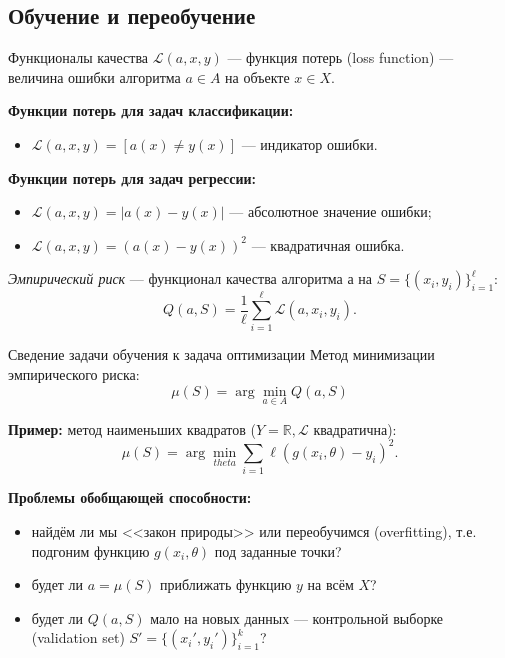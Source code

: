 \documentclass{beamer}
\begin{document}
\subsection{Обучение и переобучение}
\begin{frame}{Функционалы качества}
$\mathscr{L}(a, x, y)$ --- функция потерь (loss function) --- величина ошибки алгоритма $a \in A$ на объекте $x \in X$.

{\bf Функции потерь для задач классификации:}
\begin{itemize}
    \item $\mathscr{L}(a, x, y) = [a(x) \ne y(x)]$ --- индикатор ошибки.
\end{itemize}

{\bf Функции потерь для задач регрессии:}
\begin{itemize}
    \item $\mathscr{L}(a, x, y) = |a(x) - y(x)|$ --- абсолютное значение ошибки;
    \item $\mathscr{L}(a, x, y) = \left(a(x) - y(x)\right)^2$ --- квадратичная ошибка.
\end{itemize}

{\it Эмпирический риск} --- функционал качества алгоритма $а$ на $S = \{(x_i, y_i)\}_{i=1}^{\ell}$:
$$
Q(a, S) = \frac{1}{\ell}\sum\limits_{i = 1}^{\ell}\mathscr{L}(a, x_i, y_i).
$$
\end{frame}

\begin{frame}{Сведение задачи обучения к задача оптимизации}
Метод минимизации эмпирического риска:
$$
\mu(S) = \arg\min_{a \in A} Q(a, S)
$$

{\bf Пример:} метод наименьших квадратов ($Y = \mathbb{R}, \mathscr{L}$ квадратична):
$$
\mu(S) = \arg\min_{theta}\sum\limits_{i=1}{\ell}\left(g(x_i, \theta) - y_i\right)^2.
$$

{\bf Проблемы обобщающей способности:}
\begin{itemize}
    \item найдём ли мы <<закон природы>> или переобучимся (overfitting), т.е. подгоним функцию $g(x_i,\theta)$ под заданные точки?
    \item будет ли $a = \mu(S)$ приближать функцию $y$ на всём $X$?
    \item будет ли $Q(a, S)$ мало на новых данных --- контрольной выборке (validation set) $S' = \{(x_i', y_i')\}_{i=1}^{k}$?
\end{itemize}
\end{frame}
\end{document}
